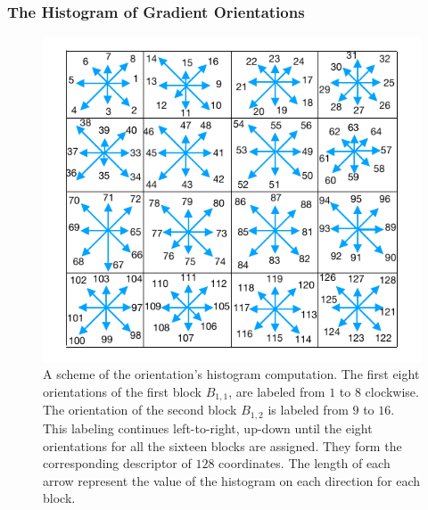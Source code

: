 \documentclass[aspectratio=169]{beamer}
\begin{document}
\begin{frame}
\frametitle{The Histogram of Gradient Orientations}
\begin{center}
\begin{figure}[h!]
\centering
\includegraphics[width=16cm]{images/gradientorientations.pdf}
\caption[Gradient Orientations Numbering]{A scheme of the orientation's histogram computation. The first eight orientations of the first block $ B_{1,1} $, are labeled from $1$ to $8$ clockwise. The orientation of the second block $ B_{1,2} $ is labeled from $9$ to $16$.  This labeling continues left-to-right, up-down until the eight orientations for all the sixteen blocks are assigned. They form the corresponding descriptor of $128$ coordinates.  The length of each arrow represent the value of the histogram on each direction for each block.}
\label{fig:orientationsfull}
\end{figure}
\end{center}
\end{frame}
\end{document}
